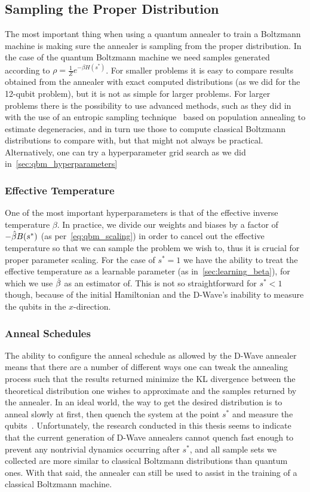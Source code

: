\subsection{Sampling the Proper Distribution}
The most important thing when using a quantum annealer to train a Boltzmann machine is making sure the annealer is sampling from the proper distribution.
In the case of the quantum Boltzmann machine we need samples generated according to \( \rho = \frac{1}{Z} e^{-\beta H(s^*)} \).
For smaller problems it is easy to compare results obtained from the annealer with exact computed distributions (as we did for the 12-qubit problem), but it is not as simple for larger problems.
For larger problems there is the possibility to use advanced methods, such as they did in~\cite{marshall_2019} with the use of an entropic sampling technique~\cite{barash_2019} based on population annealing to estimate degeneracies, and in turn use those to compute classical Boltzmann distributions to compare with, but that might not always be practical.
Alternatively, one can try a hyperparameter grid search as we did in~\cref{sec:qbm_hyperparameters}

\subsubsection{Effective Temperature}
One of the most important hyperparameters is that of the effective inverse temperature \( \beta \).
In practice, we divide our weights and biases by a factor of \( -\hat{\beta} B(s^*) \) (as per~\cref{eq:qbm_scaling}) in order to cancel out the effective temperature so that we can sample the problem we wish to, thus it is crucial for proper parameter scaling.
For the case of \( s^* = 1 \) we have the ability to treat the effective temperature as a learnable parameter (as in~\cref{sec:learning_beta}), for which we use \( \hat{\beta} \) as an estimator of.
This is not so straightforward for \( s^* < 1 \) though, because of the initial Hamiltonian and the D-Wave's inability to measure the qubits in the \( x \)-direction.

\subsubsection{Anneal Schedules}
The ability to configure the anneal schedule as allowed by the D-Wave annealer means that there are a number of different ways one can tweak the annealing process such that the results returned minimize the KL divergence between the theoretical distribution one wishes to approximate and the samples returned by the annealer.
In an ideal world, the way to get the desired distribution is to anneal slowly at first, then quench the system at the point \( s^* \) and measure the qubits~\cite{amin_2018}.
Unfortunately, the research conducted in this thesis seems to indicate that the current generation of D-Wave annealers cannot quench fast enough to prevent any nontrivial dynamics occurring after \( s^* \), and all sample sets we collected are more similar to classical Boltzmann distributions than quantum ones.
With that said, the annealer can still be used to assist in the training of a classical Boltzmann machine.

